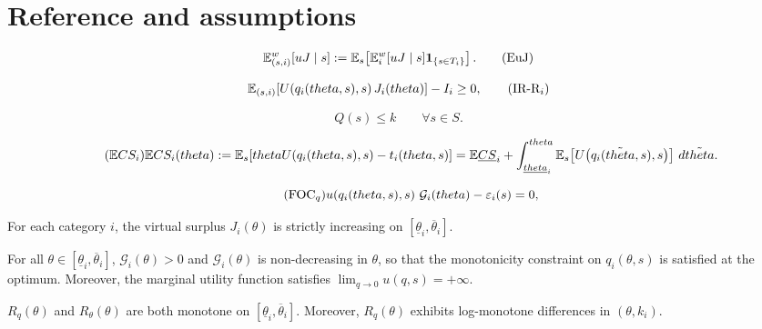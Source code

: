 \documentclass[master.tex]{subfiles}
\begin{document}
\section{Reference and assumptions}
\begin{equation}
\mathbb{E}_{(s,i)}^w[uJ\mid s] := \mathbb E_s\!\left[\mathbb{E}_i^w[uJ\mid s]\mathbf 1_{\{s\in T_i\}}\right]. \tag{EuJ}\label{Eujmd}
\end{equation}

\begin{equation}
    \mathbb{E}_{(s,i)}\!\left[U\!\left(q_i(theta,s),s\right) J_i(theta)\right]-I_i \ge 0,
\label{Rmdi-def}\tag{IR-R$_i$} 
\end{equation}

\begin{equation}
Q(s) \le k \qquad \forall s \in S.
\tag{K}\label{K-def}
\end{equation}

\[ \tag{$\E CS_i$}\label{ECSi} \E CS_i(\theta):=\E_s\!\left[\theta U\!\left(q_i(\theta,s),s\right)-t_i(\theta,s)\right] = \E\underline{CS}_i+\int_{\underline{\theta}_i}^{\theta}\E_s\!\left[U\!\left(q_i(\tilde{\theta},s),s\right)\right]\,d\tilde{\theta}. \]

\[
\label{KKT-qMD}\tag{FOC$_q$}
u\!\left(q_i(theta,s),s\right)\,\mathcal{G}_i(theta)-\varepsilon_i(s)=0,
\]

\renewcommand{\theassumption}{Reg}
\begin{assumption}\label{ass:regularity}
For each category $i$, the virtual surplus $J_i(\theta)$ is strictly increasing on $[\underline{\theta}_i, \overline{\theta}_i]$.
\end{assumption}
\renewcommand{\theassumption}{\arabic{assumption}}


\renewcommand{\theassumption}{Int}
\begin{assumption}\label{ass:interior}
For all $\theta\in\left[\underline{\theta}_i,\overline{\theta}_i\right]$, $\mathcal{G}_i(\theta)>0$ and $\mathcal{G}_i(\theta)$ is non-decreasing in $\theta$, so that the monotonicity constraint on $q_i(\theta,s)$ is satisfied at the optimum. Moreover, the marginal utility function satisfies $\lim_{q\rightarrow 0}u(q,s) = +\infty$.
\end{assumption}
\renewcommand{\theassumption}{\arabic{assumption}}


\renewcommand{\theassumption}{Monot.}
\begin{assumption}\label{ass:monotone}
\(R_q(\theta)\) and \(R_\theta(\theta)\) are both monotone on \([\underline{\theta}_i,\overline{\theta}_i]\). Moreover, \(R_q(\theta)\) exhibits log-monotone differences in \((\theta,k_i)\).
\end{assumption}
\renewcommand{\theassumption}{\arabic{assumption}}
\end{document}
